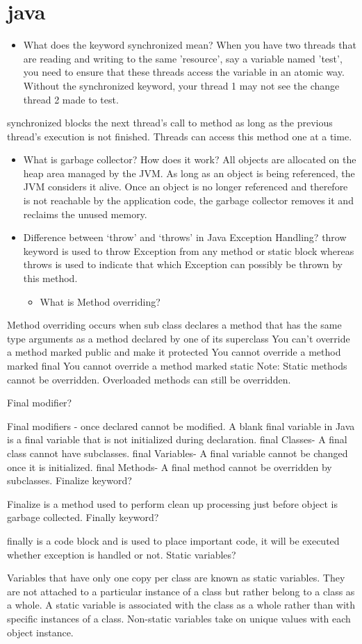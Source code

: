 \documentclass[11pt]{article}
\begin{document}
\section{java}
\label{sec:org768bead}
\begin{itemize}
\item What does the keyword synchronized mean?
When you have two threads that are reading and writing to the same 'resource', say a variable named 'test', you need to ensure that these threads access the variable in an atomic way. Without the synchronized keyword, your thread 1 may not see the change thread 2 made to test.
\end{itemize}
synchronized blocks the next thread's call to method as long as the previous thread's execution is not finished. Threads can access this method one at a time.
\begin{itemize}
\item What is garbage collector? How does it work?
All objects are allocated on the heap area managed by the JVM. As long as an object is being referenced, the JVM considers it alive. Once an object is no longer referenced and therefore is not reachable by the application code, the garbage collector removes it and reclaims the unused memory.
\item Difference between ‘throw’ and ‘throws’ in Java Exception Handling?
throw keyword is used to throw Exception from any method or static block whereas throws is used to indicate that which Exception can possibly be thrown by this method.
\begin{itemize}
\item What is Method overriding?
\end{itemize}
\end{itemize}

Method overriding occurs when sub class declares a method that has the same type arguments as a method declared by one of its superclass
You can’t override a method marked public and make it protected
You cannot override a method marked final
You cannot override a method marked static
Note: Static methods cannot be overridden. Overloaded methods can still be overridden.


Final modifier?

Final modifiers - once declared cannot be modified. A blank final variable in Java is a final variable that is not initialized during declaration.
final Classes- A final class cannot have subclasses.
final Variables- A final variable cannot be changed once it is initialized.
final Methods- A final method cannot be overridden by subclasses.
Finalize keyword?

Finalize is a method used to perform clean up processing just before object is garbage collected.
Finally keyword?

finally is a code block and is used to place important code, it will be executed whether exception is handled or not.
Static variables?

Variables that have only one copy per class are known as static variables. They are not attached to a particular instance of a class but rather belong to a class as a whole.
A static variable is associated with the class as a whole rather than with specific instances of a class. Non-static variables take on unique values with each object instance.
\end{document}
